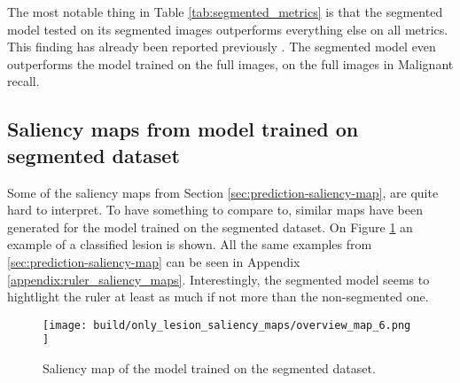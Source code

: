 The most notable thing in Table \ref{tab:segmented_metrics} is that the segmented model tested
on its segmented images outperforms everything else on all metrics.
This finding has already been reported previously \cite{segmenting-improves-performance}.
The segmented model even outperforms the model trained on the full images, on the full images in Malignant recall.

\subsection{Saliency maps from model trained on segmented dataset}
Some of the saliency maps from Section \ref{sec:prediction-saliency-map},
are quite hard to interpret.
To have something to compare to, similar maps have been generated for the model
trained on the segmented dataset.
On Figure \ref{fig:segmented_prediction_saliency_map} an example of a classified lesion is shown.
All the same examples from \ref{sec:prediction-saliency-map} can be seen in Appendix \ref{appendix:ruler_saliency_maps}.
Interestingly, the segmented model seems to hightlight the ruler at least as much if not more than the non-segmented one.
\begin{figure}[ht]
    \centering
    \texttt{[image: 
        build/only\_lesion\_saliency\_maps/overview\_map\_6.png
    ]}
    \caption{Saliency map of the model trained on the segmented dataset.}
    \label{fig:segmented_prediction_saliency_map}
\end{figure}
